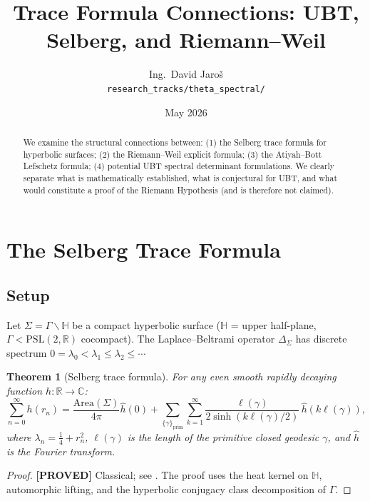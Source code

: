 \documentclass[11pt,a4paper]{article}
\title{Trace Formula Connections: UBT, Selberg, and Riemann--Weil}
\author{Ing.\ David Jaro\v{s}\\
\small \texttt{research\_tracks/theta\_spectral/}}
\date{May 2026}
\newtheorem{theorem}{Theorem}
\newcommand{\proved}[1]{\textbf{[PROVED]} #1}
\begin{document}
\maketitle

\begin{abstract}
We examine the structural connections between:
(1) the Selberg trace formula for hyperbolic surfaces;
(2) the Riemann--Weil explicit formula;
(3) the Atiyah--Bott Lefschetz formula;
(4) potential UBT spectral determinant formulations.
We clearly separate what is mathematically established, what is
conjectural for UBT, and what would constitute a proof of the
Riemann Hypothesis (and is therefore not claimed).
\end{abstract}

\tableofcontents

\section{The Selberg Trace Formula}

\subsection{Setup}

Let $\Sigma = \Gamma\backslash\mathbb{H}$ be a compact hyperbolic surface
($\mathbb{H}$ = upper half-plane, $\Gamma < \mathrm{PSL}(2,\mathbb{R})$ cocompact).
The Laplace--Beltrami operator $\Delta_\Sigma$ has discrete spectrum
$0 = \lambda_0 < \lambda_1 \leq \lambda_2 \leq \cdots$

\begin{theorem}[Selberg trace formula]
  \label{thm:Selberg}
  For any even smooth rapidly decaying function $h:\mathbb{R}\to\mathbb{C}$:
  \[
    \sum_{n=0}^\infty h(r_n)
    = \frac{\mathrm{Area}(\Sigma)}{4\pi}\hat{h}(0)
    + \sum_{\{\gamma\}_\mathrm{prim}} \sum_{k=1}^\infty
      \frac{\ell(\gamma)}{2\sinh(k\ell(\gamma)/2)}\, \hat{h}(k\ell(\gamma)),
  \]
  where $\lambda_n = \frac14 + r_n^2$, $\ell(\gamma)$ is the length of the
  primitive closed geodesic $\gamma$, and $\hat{h}$ is the Fourier transform.
\end{theorem}

\begin{proof}
  \proved{} Classical; see \cite{Hejhal,McKean}.  The proof uses the
  heat kernel on $\mathbb{H}$, automorphic lifting, and the hyperbolic
  conjugacy class decomposition of $\Gamma$.
\end{proof}
\end{document}
